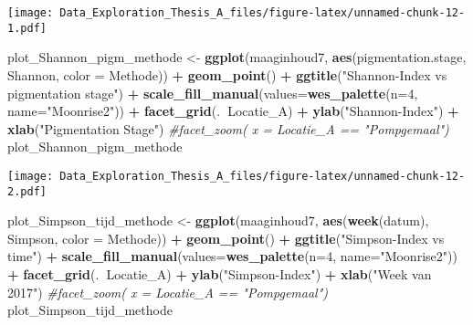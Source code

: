 \documentclass[]{article}
\newenvironment{Shaded}{\begin{snugshade}}{\end{snugshade}}
\newcommand{\KeywordTok}[1]{\textcolor[rgb]{0.13,0.29,0.53}{\textbf{#1}}}
\newcommand{\DataTypeTok}[1]{\textcolor[rgb]{0.13,0.29,0.53}{#1}}
\newcommand{\DecValTok}[1]{\textcolor[rgb]{0.00,0.00,0.81}{#1}}
\newcommand{\StringTok}[1]{\textcolor[rgb]{0.31,0.60,0.02}{#1}}
\newcommand{\CommentTok}[1]{\textcolor[rgb]{0.56,0.35,0.01}{\textit{#1}}}
\newcommand{\OperatorTok}[1]{\textcolor[rgb]{0.81,0.36,0.00}{\textbf{#1}}}
\newcommand{\NormalTok}[1]{#1}
\begin{document}
\texttt{[image: Data\_Exploration\_Thesis\_A\_files/figure-latex/unnamed-chunk-12-1.pdf]}

\begin{Shaded}
\begin{Highlighting}[]
\NormalTok{plot_Shannon_pigm_methode <-}\StringTok{ }\KeywordTok{ggplot}\NormalTok{(maaginhoud7, }\KeywordTok{aes}\NormalTok{(pigmentation.stage, Shannon, }\DataTypeTok{color =}\NormalTok{ Methode)) }\OperatorTok{+}
\StringTok{  }\KeywordTok{geom_point}\NormalTok{() }\OperatorTok{+}
\StringTok{  }\KeywordTok{ggtitle}\NormalTok{(}\StringTok{"Shannon-Index vs pigmentation stage"}\NormalTok{) }\OperatorTok{+}
\StringTok{  }\KeywordTok{scale_fill_manual}\NormalTok{(}\DataTypeTok{values=}\KeywordTok{wes_palette}\NormalTok{(}\DataTypeTok{n=}\DecValTok{4}\NormalTok{, }\DataTypeTok{name=}\StringTok{"Moonrise2"}\NormalTok{)) }\OperatorTok{+}\StringTok{ }
\StringTok{  }\KeywordTok{facet_grid}\NormalTok{(.}\OperatorTok{~}\NormalTok{Locatie_A) }\OperatorTok{+}
\StringTok{  }\KeywordTok{ylab}\NormalTok{(}\StringTok{"Shannon-Index"}\NormalTok{) }\OperatorTok{+}
\StringTok{  }\KeywordTok{xlab}\NormalTok{(}\StringTok{"Pigmentation Stage"}\NormalTok{)}
  \CommentTok{#facet_zoom( x = Locatie_A == "Pompgemaal")}
\NormalTok{plot_Shannon_pigm_methode}
\end{Highlighting}
\end{Shaded}

\texttt{[image: Data\_Exploration\_Thesis\_A\_files/figure-latex/unnamed-chunk-12-2.pdf]}

\begin{Shaded}
\begin{Highlighting}[]
\NormalTok{plot_Simpson_tijd_methode <-}\StringTok{ }\KeywordTok{ggplot}\NormalTok{(maaginhoud7, }\KeywordTok{aes}\NormalTok{(}\KeywordTok{week}\NormalTok{(datum), Simpson, }\DataTypeTok{color =}\NormalTok{ Methode)) }\OperatorTok{+}
\StringTok{  }\KeywordTok{geom_point}\NormalTok{() }\OperatorTok{+}
\StringTok{  }\KeywordTok{ggtitle}\NormalTok{(}\StringTok{"Simpson-Index vs time"}\NormalTok{) }\OperatorTok{+}
\StringTok{  }\KeywordTok{scale_fill_manual}\NormalTok{(}\DataTypeTok{values=}\KeywordTok{wes_palette}\NormalTok{(}\DataTypeTok{n=}\DecValTok{4}\NormalTok{, }\DataTypeTok{name=}\StringTok{"Moonrise2"}\NormalTok{)) }\OperatorTok{+}\StringTok{ }
\StringTok{  }\KeywordTok{facet_grid}\NormalTok{(.}\OperatorTok{~}\NormalTok{Locatie_A) }\OperatorTok{+}
\StringTok{  }\KeywordTok{ylab}\NormalTok{(}\StringTok{"Simpson-Index"}\NormalTok{) }\OperatorTok{+}
\StringTok{  }\KeywordTok{xlab}\NormalTok{(}\StringTok{"Week van 2017"}\NormalTok{)}
  \CommentTok{#facet_zoom( x = Locatie_A == "Pompgemaal")}
\NormalTok{plot_Simpson_tijd_methode}
\end{Highlighting}
\end{Shaded}
\end{document}
